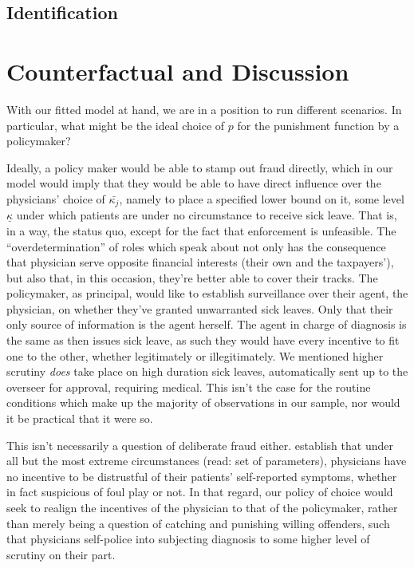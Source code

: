 \documentclass[../main.tex]{subfiles}
\begin{document}
\subsection{Identification}

\newpage

\section{Counterfactual and Discussion}

With our fitted model at hand, we are in a position to run different scenarios. In particular, what might be the ideal choice of $p$ for the punishment function by a policymaker?

Ideally, a policy maker would be able to stamp out fraud directly, which in our model would imply that they would be able to have direct influence over the physicians' choice of $\bar{\kappa_j}$, namely to place a specified lower bound on it, some level $\underline{\kappa}$ under which patients are under no circumstance to receive sick leave. That is, in a way, the status quo, except for the fact that enforcement is unfeasible. The ``overdetermination'' of roles which \cite{markussen-roed} speak about not only has the consequence that physician serve opposite financial interests (their own and the taxpayers'), but also that, in this occasion, they're better able to cover their tracks. The policymaker, as principal, would like to establish surveillance over their agent, the physician, on whether they've granted unwarranted sick leaves. Only that their only source of information is the agent herself. The agent in charge of diagnosis is the same as then issues sick leave, as such they would have every incentive to fit one to the other, whether legitimately or illegitimately. We mentioned higher scrutiny \textit{does} take place on high duration sick leaves, automatically sent up to the overseer for approval, requiring medical. This isn't the case for the routine conditions which make up the majority of observations in our sample, nor would it be practical that it were so.

This isn't necessarily a question of deliberate fraud either. \cite{cln} establish that under all but the most extreme circumstances (read: set of parameters), physicians have no incentive to be distrustful of their patients' self-reported symptoms, whether in fact suspicious of foul play or not. In that regard, our policy of choice would seek to realign the incentives of the physician to that of the policymaker, rather than merely being a question of catching and punishing willing offenders, such that physicians self-police into subjecting diagnosis to some higher level of scrutiny on their part.
\end{document}
